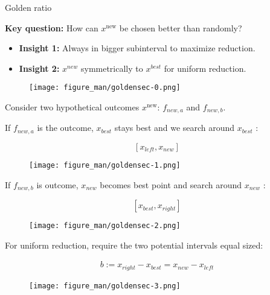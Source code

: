 \documentclass[11pt,compress,t,notes=noshow, xcolor=table]{beamer}
\begin{document}
\begin{vbframe}{Golden ratio}

\textbf{Key question:} How can $x^{\text{new}}$ be chosen better than randomly? 

\begin{itemize}
    \item \textbf{Insight 1: } Always in bigger subinterval to maximize reduction.
    \item \textbf{Insight 2: } $x^{new}$ symmetrically to $x^{best}$ for uniform reduction. 
\end{itemize}

\begin{figure}
\texttt{[image: figure\_man/goldensec-0.png]}
\end{figure}

\vspace*{-0.5cm}

Consider two hypothetical outcomes $x^{\text{new}}$: $f_{new, a}$ and $f_{new, b}$. 

\framebreak

If $f_{new, a}$ is the outcome, $x_{best}$ stays best and we search around $x_{best}$ : 

$$
    [x_{left}, x_{new}]
$$

\begin{figure}
\texttt{[image: figure\_man/goldensec-1.png]}\\
\end{figure}

\framebreak 

If $f_{new, b}$ is outcome, $x_{new}$ becomes best point and search around $x_{new}$ : 

$$
    [x_{best}, x_{right}] 
$$

\begin{figure}
\texttt{[image: figure\_man/goldensec-2.png]}\\
\end{figure}

\framebreak 

For uniform reduction, require the two potential intervals equal sized: 

\begin{eqnarray*}
    b := x_{right} - x_{best} = x_{new} - x_{left}
\end{eqnarray*}

\begin{figure}
\texttt{[image: figure\_man/goldensec-3.png]}\\
\end{figure}


\end{vbframe}
\end{document}
